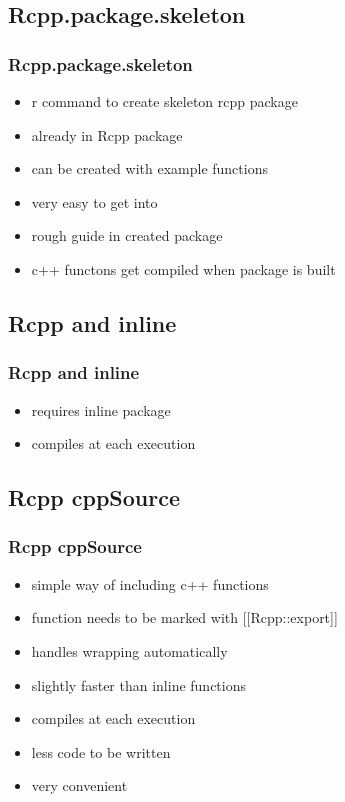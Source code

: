 \documentclass[hyperef={
    colorlinks=true,
    linkcolor=blue,
    filecolor=black,
urlcolor=blue}
]{beamer}
\begin{document}
\subsection{Rcpp.package.skeleton}
\begin{frame}
    \frametitle{Rcpp.package.skeleton}
\begin{itemize}
    \item r command to create skeleton rcpp package
    \item already in Rcpp package
    \item can be created with example functions
    \item very easy to get into
    \item rough guide in created package
    \item c++ functons get compiled when package is built
\end{itemize}
\end{frame}

\subsection{Rcpp and inline}
\begin{frame}
    \frametitle{Rcpp and inline}
\begin{itemize}
    \item requires inline package 
    \item compiles at each execution
\end{itemize}
\end{frame}

\subsection{Rcpp cppSource}
\begin{frame}
    \frametitle{Rcpp cppSource}
\begin{itemize}
    \item simple way of including c++ functions
    \item function needs to be marked with [[Rcpp::export]]
    \item handles wrapping automatically
    \item slightly faster than inline functions
    \item compiles at each execution
    \item less code to be written
    \item very convenient
\end{itemize}
\end{frame}
\end{document}
